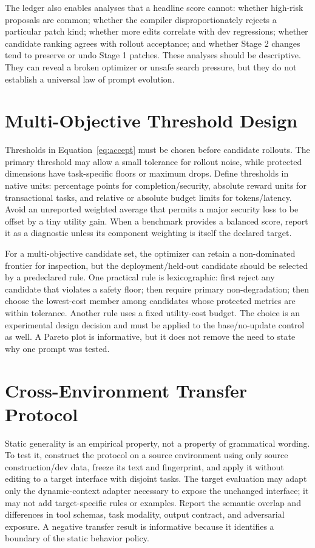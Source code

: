 \documentclass[10pt]{article}
\begin{document}
The ledger also enables analyses that a headline score cannot: whether high-risk proposals are common; whether the compiler disproportionately rejects a particular patch kind; whether more edits correlate with dev regressions; whether candidate ranking agrees with rollout acceptance; and whether Stage 2 changes tend to preserve or undo Stage 1 patches. These analyses should be descriptive. They can reveal a broken optimizer or unsafe search pressure, but they do not establish a universal law of prompt evolution.

\section{Multi-Objective Threshold Design}
Thresholds in Equation~\ref{eq:accept} must be chosen before candidate rollouts. The primary threshold may allow a small tolerance for rollout noise, while protected dimensions have task-specific floors or maximum drops. Define thresholds in native units: percentage points for completion/security, absolute reward units for transactional tasks, and relative or absolute budget limits for tokens/latency. Avoid an unreported weighted average that permits a major security loss to be offset by a tiny utility gain. When a benchmark provides a balanced score, report it as a diagnostic unless its component weighting is itself the declared target.

For a multi-objective candidate set, the optimizer can retain a non-dominated frontier for inspection, but the deployment/held-out candidate should be selected by a predeclared rule. One practical rule is lexicographic: first reject any candidate that violates a safety floor; then require primary non-degradation; then choose the lowest-cost member among candidates whose protected metrics are within tolerance. Another rule uses a fixed utility-cost budget. The choice is an experimental design decision and must be applied to the base/no-update control as well. A Pareto plot is informative, but it does not remove the need to state why one prompt was tested.

\section{Cross-Environment Transfer Protocol}
Static generality is an empirical property, not a property of grammatical wording. To test it, construct the protocol on a source environment using only source construction/dev data, freeze its text and fingerprint, and apply it without editing to a target interface with disjoint tasks. The target evaluation may adapt only the dynamic-context adapter necessary to expose the unchanged interface; it may not add target-specific rules or examples. Report the semantic overlap and differences in tool schemas, task modality, output contract, and adversarial exposure. A negative transfer result is informative because it identifies a boundary of the static behavior policy.
\end{document}
